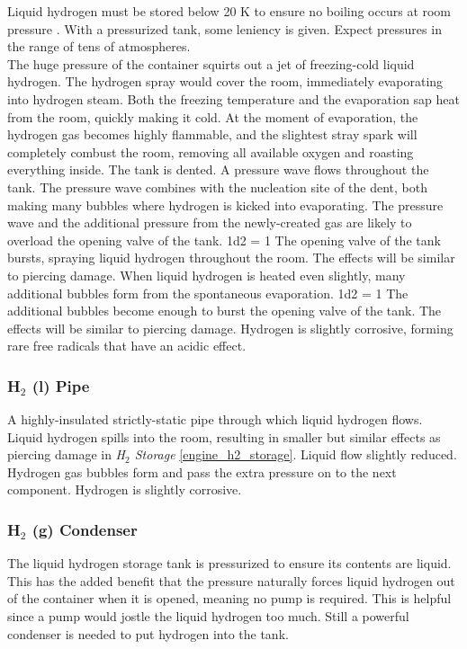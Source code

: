 \documentclass[a4paper]{article}
\begin{document}
Liquid hydrogen must be stored below 20 K to ensure no boiling occurs at room pressure \cite{international_temperature_scale_of_1968}. With a pressurized tank, some leniency is given. Expect pressures in the range of tens of atmospheres.
\\ \pbhw
{The huge pressure of the container squirts out a jet of freezing-cold liquid hydrogen. The hydrogen spray would cover the room, immediately evaporating into hydrogen steam. Both the freezing temperature and the evaporation sap heat from the room, quickly making it cold. At the moment of evaporation, the hydrogen gas becomes highly flammable, and the slightest stray spark will completely combust the room, removing all available oxygen and roasting everything inside.}
{The tank is dented. A pressure wave flows throughout the tank. The pressure wave combines with the nucleation site of the dent, both making many bubbles where hydrogen is kicked into evaporating. The pressure wave and the additional pressure from the newly-created gas are likely to overload the opening valve of the tank. \newline 1d2 = 1 The opening valve of the tank bursts, spraying liquid hydrogen throughout the room. The effects will be similar to piercing damage.}
{When liquid hydrogen is heated even slightly, many additional bubbles form from the spontaneous evaporation. \newline 1d2 = 1 The additional bubbles become enough to burst the opening valve of the tank. The effects will be similar to piercing damage.}
{Hydrogen is slightly corrosive, forming rare free radicals that have an acidic effect.}


\vspace{-0.5cm} \hspace{-18pt} \subsubsection{H$_2$ (l) Pipe} \label{engine_h2_pipe} \vspace{-0.2cm}
A highly-insulated strictly-static pipe through which liquid hydrogen flows.
\\ \pbhw
{Liquid hydrogen spills into the room, resulting in smaller but similar effects as piercing damage in \textit{H$_2$ Storage} \ref{engine_h2_storage}.}
{Liquid flow slightly reduced.}
{Hydrogen gas bubbles form and pass the extra pressure on to the next component.}
{Hydrogen is slightly corrosive.}


\vspace{-0.5cm} \hspace{-18pt} \subsubsection{H$_2$ (g) Condenser} \label{engine_h2_condenser} \vspace{-0.2cm}
The liquid hydrogen storage tank is pressurized to ensure its contents are liquid. This has the added benefit that the pressure naturally forces liquid hydrogen out of the container when it is opened, meaning no pump is required. This is helpful since a pump would jostle the liquid hydrogen too much. Still a powerful condenser is needed to put hydrogen into the tank. 
\end{document}

